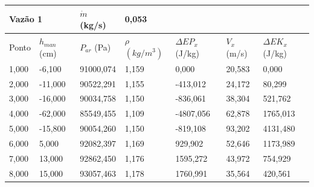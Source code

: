 \documentclass[12pt, a4]{article}
\begin{document}
\begin{table}[H]
    \begin{tabular}{|ll|l|l|lll}
    \cline{1-4}
    \multicolumn{2}{|l|}{Vazão 1}         & $ \dot{m} $ (kg/s) & 0,053 &                                &                             &                               \\ \hline
    \multicolumn{1}{|l|}{Ponto} &
      $ h_{man} $ (cm) &
      $P_{ar}$ (Pa) &
      $ \rho $ $(kg / m^3)$ &
      \multicolumn{1}{l|}{$ \Delta EP_x $ (J/kg)} &
      \multicolumn{1}{l|}{$V_x$ (m/s)} &
      \multicolumn{1}{l|}{$ \Delta EK_x $ (J/kg)} \\ \hline
    \multicolumn{1}{|l|}{1,000} & -6,100  & 91000,074          & 1,159 & \multicolumn{1}{l|}{0,000}     & \multicolumn{1}{l|}{20,583} & \multicolumn{1}{l|}{0,000}    \\ \hline
    \multicolumn{1}{|l|}{2,000} & -11,000 & 90522,291          & 1,155 & \multicolumn{1}{l|}{-413,012}  & \multicolumn{1}{l|}{24,172} & \multicolumn{1}{l|}{80,299}   \\ \hline
    \multicolumn{1}{|l|}{3,000} & -16,000 & 90034,758          & 1,150 & \multicolumn{1}{l|}{-836,061}  & \multicolumn{1}{l|}{38,304} & \multicolumn{1}{l|}{521,762}  \\ \hline
    \multicolumn{1}{|l|}{4,000} & -62,000 & 85549,455          & 1,109 & \multicolumn{1}{l|}{-4807,056} & \multicolumn{1}{l|}{62,878} & \multicolumn{1}{l|}{1765,013} \\ \hline
    \multicolumn{1}{|l|}{5,000} & -15,800 & 90054,260          & 1,150 & \multicolumn{1}{l|}{-819,108}  & \multicolumn{1}{l|}{93,202} & \multicolumn{1}{l|}{4131,480} \\ \hline
    \multicolumn{1}{|l|}{6,000} & 5,000   & 92082,397          & 1,169 & \multicolumn{1}{l|}{929,902}   & \multicolumn{1}{l|}{52,646} & \multicolumn{1}{l|}{1173,989} \\ \hline
    \multicolumn{1}{|l|}{7,000} & 13,000  & 92862,450          & 1,176 & \multicolumn{1}{l|}{1595,272}  & \multicolumn{1}{l|}{43,972} & \multicolumn{1}{l|}{754,929}  \\ \hline
    \multicolumn{1}{|l|}{8,000} & 15,000  & 93057,463          & 1,178 & \multicolumn{1}{l|}{1760,991}  & \multicolumn{1}{l|}{35,564} & \multicolumn{1}{l|}{420,561}  \\ \hline
    \end{tabular}
\end{table}
\end{document}
